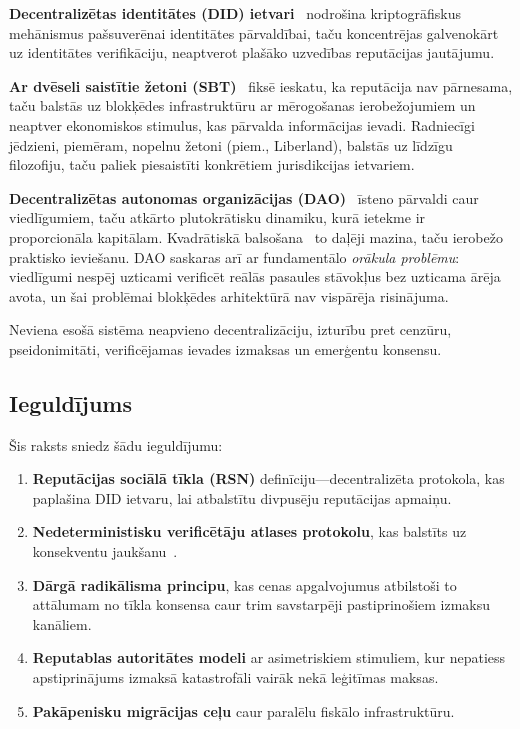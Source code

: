 \documentclass[11pt,a4paper,twocolumn]{article}
\begin{document}
\textbf{Decentralizētas identitātes (DID) ietvari}~\cite{did2022} nodrošina kriptogrāfiskus mehānismus paš\-suverēnai identitātes pārvaldībai, taču koncentrējas galvenokārt uz identitātes verifikāciju, neaptverot plašāko uzvedības reputācijas jautājumu.

\textbf{Ar dvēseli saistītie žetoni (SBT)}~\cite{weyl2022} fiksē ieskatu, ka reputācija nav pārnesama, taču balstās uz blokķēdes infrastruktūru ar mērogošanas ierobežojumiem un neaptver ekonomiskos stimulus, kas pārvalda informācijas ievadi. Radniecīgi jēdzieni, piemēram, nopelnu žetoni (piem., Liberland), balstās uz līdzīgu filozofiju, taču paliek piesaistīti konkrētiem jurisdikcijas ietvariem.

\textbf{Decentralizētas autonomas organizācijas (DAO)}~\cite{buterin2014} īsteno pārvaldi caur viedlīgumiem, taču atkārto plutokrātisku dinamiku, kurā ietekme ir proporcionāla kapitālam. Kvadrātiskā balsošana~\cite{buterin2019} to daļēji mazina, taču ierobežo praktisko ieviešanu. DAO saskaras arī ar fundamentālo \emph{orākula problēmu}: viedlīgumi nespēj uzticami verificēt reālās pasaules stāvokļus bez uzticama ārēja avota, un šai problēmai blokķēdes arhitektūrā nav vispārēja risinājuma.

Neviena esošā sistēma neapvieno decentralizāciju, izturību pret cenzūru, pseidonimitāti, verificējamas ievades izmaksas un emerģentu konsensu.

\subsection{Ieguldījums}

Šis raksts sniedz šādu ieguldījumu:
\begin{enumerate}[nosep]
\item \textbf{Reputācijas sociālā tīkla (RSN)} definīciju---decentralizēta protokola, kas paplašina DID ietvaru, lai atbalstītu divpusēju reputācijas apmaiņu.
\item \textbf{Nedeterministisku verificētāju atlases protokolu}, kas balstīts uz konsekventu jaukšanu~\cite{karger1997}.
\item \textbf{Dārgā radikālisma principu}, kas cenas apgalvojumus atbilstoši to attālumam no tīkla konsensa caur trim savstarpēji pastiprinošiem izmaksu kanāliem.
\item \textbf{Reputablas autoritātes modeli} ar asimetriskiem stimuliem, kur nepatiess apstiprinājums izmaksā katastrofāli vairāk nekā leģitīmas maksas.
\item \textbf{Pakāpenisku migrācijas ceļu} caur paralēlu fiskālo infrastruktūru.
\end{enumerate}
\end{document}
